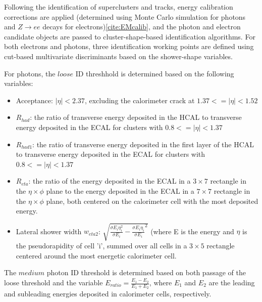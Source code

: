 Following the identification of superclusters and tracks, energy calibration corrections are applied (determined using Monte Carlo simulation for photons and $Z \rightarrow ee$ decays for electrons)\ref{cite:EMcalib}, and the photon and electron candidate objects are passed to cluster-shape-based identification algorithms. For both electrons and photons, three identification working points are defined using cut-based multivariate discriminants based on the shower-shape variables.

For photons, the $loose$ ID threshhold is determined based on the following variables:
\begin{itemize}
  \item Acceptance: $|\eta|<2.37$, excluding the calorimeter crack at $1.37 <= |\eta|<1.52$  
  \item $R_{had}$: the ratio of transverse energy deposited in the HCAL to transverse energy deposited in the ECAL for clusters with $0.8 <= |\eta|<1.37$ 
  \item $R_{had1}$: the ratio of transverse energy deposited in the first layer of the HCAL to transverse energy deposited in the ECAL for clusters with $0.8 <= |\eta|<1.37$ 
  \item $R_{eta}$: the ratio of the energy deposited in the ECAL in a $3 \times 7$ rectangle in the $\eta \times \phi$ plane to the energy deposited in the ECAL in a $7 \times 7$ rectangle in the $\eta \times \phi$ plane, both centered on the calorimeter cell with the most deposited energy. 
   \item Lateral shower width $w_{eta2}$: $\sqrt{\frac{\sigma E_{i} \eta_{i}^{2}}{\sigma E_{i}}-{\frac{\sigma E_{i} \eta_{i}}{\sigma E_{i}}}^2}$ (where E is the energy and $\eta$ is the pseudorapidity of cell 'i', summed over all cells in a $3 \times 5$ rectangle centered around the most energetic calorimeter cell. 
\end{itemize}

The $medium$ photon ID threshold is determined based on both passage of the loose threshold and the variable $E_{ratio} = \frac{E_{1}-E_{2}}{E_{1}+E_{2}}$, where $E_{1}$ and $E_{2}$ are the leading and subleading energies deposited in calorimeter cells, respectively.

